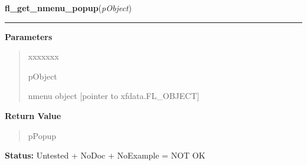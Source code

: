 \hspace{.8\funcindent}\begin{boxedminipage}{\funcwidth}

    \raggedright \textbf{fl\_get\_nmenu\_popup}(\textit{pObject})

    \vspace{-1.5ex}

    \rule{\textwidth}{0.5\fboxrule}
\setlength{\parskip}{2ex}
\setlength{\parskip}{1ex}
      \textbf{Parameters}
      \vspace{-1ex}

      \begin{quote}
        \begin{Ventry}{xxxxxxx}

          \item[pObject]

          nmenu object [pointer to xfdata.FL\_OBJECT]

        \end{Ventry}

      \end{quote}

      \textbf{Return Value}
    \vspace{-1ex}

      \begin{quote}
      pPopup

      \end{quote}

\textbf{Status:} Untested + NoDoc + NoExample = NOT OK



    \end{boxedminipage}

    \label{xformslib:library:fl_set_nmenu_popup}

    \vspace{0.5ex}


